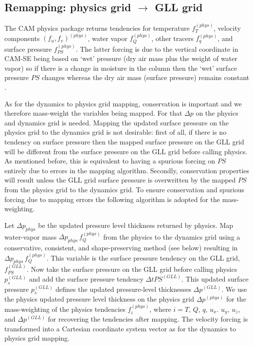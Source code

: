 \documentclass[twocol]{ametsoc}
\begin{document}
\subsection{Remapping: physics grid $\rightarrow$ GLL grid}
The CAM physics package returns tendencies for temperature $f_T^{(phys)}$, velocity components $(f_u,f_v)^{(phys)}$, water vapor $f_Q^{(phys)}$, other tracers $f_q^{(phys)}$, and surface pressure $f_{PS}^{(phys)}$. The latter forcing is due to the vertical coordinate in CAM-SE being based on `wet' pressure (dry air mass plus the weight of water vapor) so if there is a change in moisture in the column then the `wet' surface pressure  $PS$ changes whereas the dry air mass (surface pressure) remains constant \citep[see section 3.1.8 `Adjustment of pressure to include change in mass of water vapor' in ][]{CAM5}. 

As for the dynamics to physics grid mapping, conservation is important and we therefore mass-weight the variables being mapped. For that $\Delta p$ on the physics and dynamics grid is needed. Mapping the updated surface pressure on the physics grid to the dynamics grid is not desirable: first of all, if there is no tendency on surface pressure then the mapped surface pressure on the GLL grid will be different from the surface pressure on the GLL grid before calling physics. As mentioned before, this is equivalent to having a spurious forcing on $PS$ entirely due to errors in the mapping algorithm. Secondly, conservation properties will result unless the GLL grid surface pressure is overwritten by the mapped $PS$ from the physics grid to the dynamics grid. To ensure conservation and spurious forcing due to mapping errors the following algorithm is adopted for the mass-weighting.

Let $\Delta p_{phys}$ be the updated pressure level thickness returned by physics. Map water-vapor mass $\Delta p_{phys}\, f_Q^{(phys)}$ from the physics to the dynamics grid using a conservative, consistent, and shape-preserving method (see below) resulting in $\Delta p_{phys}\, f_Q^{(phys)}$. This variable is the surface pressure tendency on the GLL grid, $f_{PS}^{(GLL)}$. Now take the surface pressure on the GLL grid before calling physics $p_s^{(GLL)}$ and add the surface pressure tendency $\Delta t PS^{(GLL)}$. This updated surface pressure $p_s^{(GLL)}$ defines the updated pressure-level thicknesses $\Delta p^{(GLL)}$. We use the physics updated pressure level thickness on the physics grid $\Delta p^{(phys)}$ for the mass-weighting of the physics tendencies $f^{(phys)}_i$, where $i=T$, $Q$, $q$, $u_x$. $u_y$, $u_z$, and $\Delta p^{(GLL)}$ for recovering the tendencies after mapping. The velocity forcing is transformed into a Cartesian coordinate system vector as for the dynamics to physics grid mapping.
\end{document}
